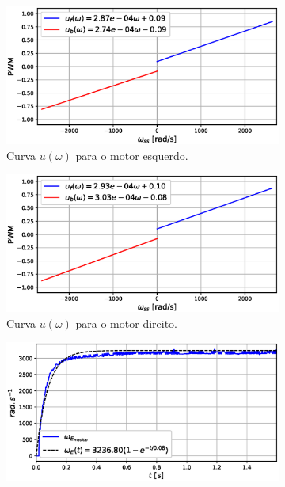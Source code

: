 \begin{figure}[H]
    \begin{subfigure}{.5\textwidth}
    \centering
    \includegraphics[width=\textwidth]{figuras/resultados/exp01/curva_feedforward_esquerdo100.eps}
    \caption{Curva $u(\omega)$ para o motor esquerdo.}
    \label{fig:exp01:curva_feedforward_esquerdo}
    \end{subfigure}
    \hfill
    \begin{subfigure}{.5\textwidth}
    \centering
    \includegraphics[width=\textwidth]{figuras/resultados/exp01/curva_feedforward_direito100.eps}
    \caption{Curva $u(\omega)$ para o motor direito.}
    \label{fig:exp01:curva_feedforward_direito}
    \end{subfigure}
    \begin{subfigure}{.5\textwidth}
    \centering
    \includegraphics[width=\textwidth]{figuras/resultados/exp01/regressao_vs_medido_esquerdo100.eps}

\end{subfigure}
\end{figure}
